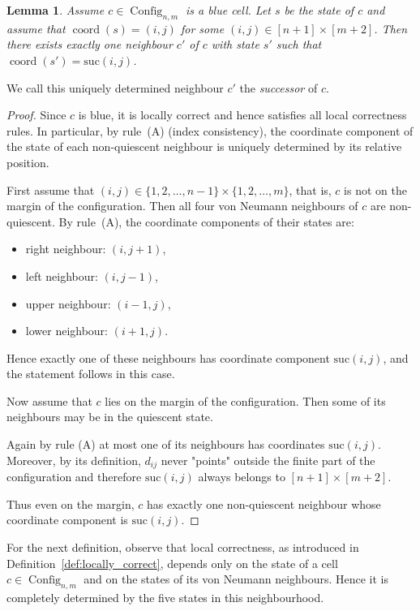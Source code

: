 \documentclass{article}
\theoremstyle{plain}
\newtheorem{lemma}[theorem]{Lemma}
\theoremstyle{definition}
\DeclareMathOperator{\Config}{Config}
\DeclareMathOperator{\coord}{coord}
\begin{document}
\begin{lemma}\label{lm:exactly_one_successor}
    Assume $c \in \Config_{n,m}$ is a blue cell. Let $s$ be the state of $c$ and assume that $\coord(s) = (i,j)$ for some $(i,j) \in [n+1] \times [m+2]$. Then there exists exactly one neighbour $c'$ of $c$ with state $s'$ such that $\coord(s') = \mathrm{suc}(i,j)$.
\end{lemma}
    We call this uniquely determined neighbour $c'$ the 
\emph{successor} of $c$.
\begin{proof}
Since $c$ is blue, it is locally correct and hence satisfies all local
correctness rules. In particular, by rule~(A) (index consistency),
the coordinate component of the state of each non-quiescent neighbour
is uniquely determined by its relative position.

First assume that $(i,j) \in \{1,2,\dots,n-1\} \times \{1,2,\dots,m\}$, that is, $c$ is not on the margin of the configuration.
Then all four von Neumann neighbours of $c$ are non-quiescent.
By rule~(A), the coordinate components of their states are:
\begin{itemize}
    \item right neighbour: $(i,j+1)$,
    \item left neighbour: $(i,j-1)$,
    \item upper neighbour: $(i-1,j)$,
    \item lower neighbour: $(i+1,j)$.
\end{itemize}
Hence exactly one of these neighbours has coordinate component
$\mathrm{suc}(i,j)$, and the statement follows in this case.

Now assume that $c$ lies on the margin of the configuration. Then some of its neighbours may be in the quiescent state.

Again by rule (A) at most one of its neighbours has coordinates $\mathrm{suc}(i,j)$. Moreover, by its definition, $d_{ij}$ never "points" outside the finite part of the configuration and therefore $\mathrm{suc}(i,j)$ always belongs to
$[n+1]\times[m+2]$. 

Thus even on the margin, $c$ has exactly one non-quiescent neighbour
whose coordinate component is $\mathrm{suc}(i,j)$.
\end{proof}


For the next definition, observe that local correctness, as introduced in Definition~\ref{def:locally_correct}, depends only on the state of a cell $c \in \Config_{n,m}$ and on the states of its von Neumann neighbours. Hence it is completely determined by the five states in this neighbourhood.
\end{document}
